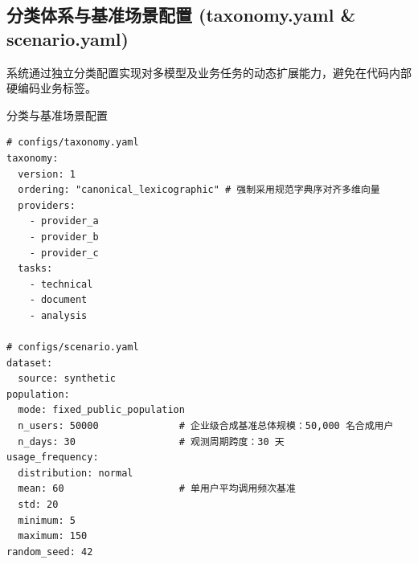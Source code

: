 \subsection{分类体系与基准场景配置 (taxonomy.yaml \& scenario.yaml)}

系统通过独立分类配置实现对多模型及业务任务的动态扩展能力，避免在代码内部硬编码业务标签。

\begin{techbox}{分类与基准场景配置}
\begin{verbatim}
# configs/taxonomy.yaml
taxonomy:
  version: 1
  ordering: "canonical_lexicographic" # 强制采用规范字典序对齐多维向量
  providers:
    - provider_a
    - provider_b
    - provider_c
  tasks:
    - technical
    - document
    - analysis

# configs/scenario.yaml
dataset:
  source: synthetic
population:
  mode: fixed_public_population
  n_users: 50000              # 企业级合成基准总体规模：50,000 名合成用户
  n_days: 30                  # 观测周期跨度：30 天
usage_frequency:
  distribution: normal
  mean: 60                    # 单用户平均调用频次基准
  std: 20
  minimum: 5
  maximum: 150
random_seed: 42
\end{verbatim}
\end{techbox}
